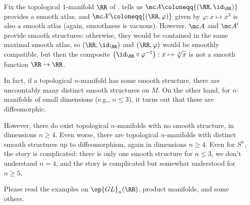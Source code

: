 \documentclass[../notes.tex]{subfiles}
\begin{document}
\begin{example}
	Fix the topological $1$-manifold $\RR$ of .  tells us $\mc A\coloneqq\{(\RR,{\id_\RR})\}$ provides a smooth atlas, and $\mc A'\coloneqq\{(\RR,\varphi)\}$ given by $\varphi\colon x\mapsto x^3$ is also a smooth atlas (again, smoothness is vacuous). However, $\mc A$ and $\mc A'$ provide smooth structures: otherwise, they would be contained in the same maximal smooth atlas, so $(\RR,{\id_\RR})$ and $(\RR,\varphi)$ would be smoothly compatible, but then the composite $\left({\id_\RR}\circ\varphi^{-1}\right)\colon x\mapsto\sqrt[3]x$ is not a smooth function $\RR\to\RR$.
\end{example}
\begin{remark}
	In fact, if a topological $n$-manifold has some smooth structure, there are uncountably many distinct smooth structures on $M$. On the other hand, for $n$-manifolds of small dimensions (e.g., $n\le3$), it turns out that these are diffeomorphic.
\end{remark}
\begin{remark}
	However, there do exist topological $n$-manifolds with no smooth structure, in dimensions $n\ge4$. Even worse, there are topological $n$-manifolds with distinct smooth structures up to diffeomorphism, again in dimensions $n\ge4$. Even for $S^n$, the story is complicated: there is only one smooth structure for $n\le3$, we don't understand $n=4$, and the story is complicated but somewhat understood for $n\ge5$.
\end{remark}
\begin{remark}
	Please read the examples on $\op{GL}_n(\RR)$, product manifolds, and some others.
\end{remark}
\end{document}
